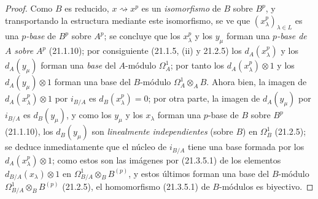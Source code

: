 \begin{proof}

Como $B$ es reducido, $x\rightsquigarrow x^p$ es un \emph{isomorfismo} de $B$
sobre $B^p$, y transportando la estructura mediante este isomorfismo, se ve
que $(x_\lambda^p)_{\lambda\in L}$ es una \emph{$p$-base} de
$B^p$ sobre $A^p$; se concluye que los $x_\lambda^p$ y los $y_\mu$ forman
una \emph{$p$-base de} $A$ \emph{sobre} $A^p$ (21.1.10); por consiguiente (21.1.5, (ii) y
21.2.5) los $d_A(x_\lambda^p)$ y los $d_A(y_\mu)$ forman una \emph{base} del $A$-módulo
$\Omega^1_A$; por tanto los $d_A(x_\lambda^p)\otimes1$ y los $d_A(y_\mu)\otimes1$
forman una base del $B$-módulo $\Omega^1_A\otimes_A B$. Ahora bien, la imagen de $d_A(x_\lambda^p)\otimes1$ por
$i_{B/A}$ es $d_B(x_\lambda^p)=0$; por otra parte, la imagen de $d_A(y_\mu)$
por $i_{B/A}$
 es $d_B(y_\mu)$, y como los $y_\mu$ y los $x_\lambda$
forman una $p$-base de $B$ sobre $B^p$ (21.1.10), los $d_B(y_\mu)$ son
\emph{linealmente independientes} (sobre $B$) en $\Omega^1_B$ (21.2.5); se deduce inmediatamente
que el núcleo de $i_{B/A}$ tiene una base formada por
los $d_A(x_\lambda^p)\otimes1$; como estos son las imágenes por (21.3.5.1) de
los elementos $d_{B/A}(x_\lambda)\otimes1$ en $\Omega^1_{B/A}\otimes_B B^{(p)}$, y estos últimos
forman una base del $B$-módulo $\Omega^1_{B/A}\otimes_B B^{(p)}$ (21.2.5), el
homomorfismo (21.3.5.1) de $B$-módulos es biyectivo.
\end{proof}

